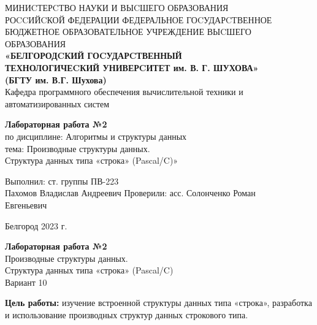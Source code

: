 \documentclass[a4paper,14pt]{extarticle}
\newcommand\textbox[1]{
	\parbox{.45\textwidth}{#1}
}
\begin{document}
\begin{center}
	\small{
		МИНИCТЕРCТВО НАУКИ И ВЫCШЕГО ОБРАЗОВАНИЯ \\РОCCИЙCКОЙ ФЕДЕРАЦИИ
		\bigbreak
		ФЕДЕРАЛЬНОЕ ГОCУДАРCТВЕННОЕ БЮДЖЕТНОЕ ОБРАЗОВАТЕЛЬНОЕ УЧРЕЖДЕНИЕ ВЫCШЕГО ОБРАЗОВАНИЯ \\
		\bigbreak
		\textbf{«БЕЛГОРОДCКИЙ ГОCУДАРCТВЕННЫЙ \\ТЕХНОЛОГИЧЕCКИЙ УНИВЕРCИТЕТ им. В. Г. ШУХОВА»\\ (БГТУ им. В.Г. Шухова)} \\
		\bigbreak
		Кафедра программного обеспечения вычислительной техники и автоматизированных систем\\}
\end{center}

\vfill
\begin{center}
	\large{
		\textbf{
			Лабораторная работа №2}}\\
	\normalsize{
		по дисциплине: Алгоритмы и структуры данных \\
		тема: Производные структуры данных. \\Структура данных типа «строка» (Pascal/C)»}
\end{center}
\vfill
\hfill\textbox{
	Выполнил: ст. группы ПВ-223\\Пахомов Владислав Андреевич
	\bigbreak
	Проверили: асс. Солонченко Роман\\Евгеньевич
}
\vfill\begin{center}
	Белгород 2023 г.
\end{center}
\newpage
\begin{center}
	\textbf{Лабораторная работа №2}\\
	Производные структуры данных. \\Структура данных типа «строка» (Pascal/C)\\
	Вариант 10
\end{center}
\textbf{Цель работы: }изучение встроенной структуры данных типа «строка»,
разработка и использование производных структур данных строкового типа.
\end{document}
